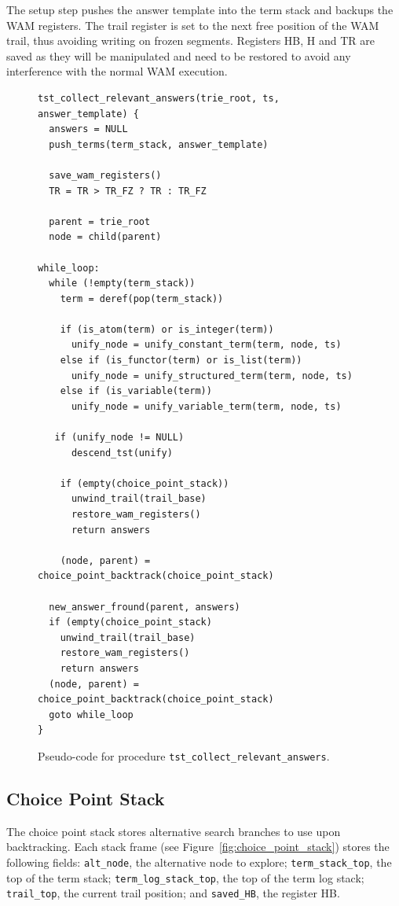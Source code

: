 The setup step pushes the answer template into the term stack and backups the WAM registers.
The trail register is set to the next free position
of the WAM trail, thus avoiding writing on frozen segments. Registers HB, H and TR are
saved as they will be manipulated and need to be restored to avoid any interference with
the normal WAM execution.

\begin{figure}[ht]
\begin{Verbatim}
tst_collect_relevant_answers(trie_root, ts, answer_template) {
  answers = NULL
  push_terms(term_stack, answer_template)
  
  save_wam_registers()
  TR = TR > TR_FZ ? TR : TR_FZ
 
  parent = trie_root
  node = child(parent)
  
while_loop:
  while (!empty(term_stack))
    term = deref(pop(term_stack))
    
    if (is_atom(term) or is_integer(term))
      unify_node = unify_constant_term(term, node, ts)
    else if (is_functor(term) or is_list(term))
      unify_node = unify_structured_term(term, node, ts)
    else if (is_variable(term))
      unify_node = unify_variable_term(term, node, ts)
      
   if (unify_node != NULL)
      descend_tst(unify)
      
    if (empty(choice_point_stack))
      unwind_trail(trail_base)
      restore_wam_registers()
      return answers
    
    (node, parent) = choice_point_backtrack(choice_point_stack)
  
  new_answer_fround(parent, answers)
  if (empty(choice_point_stack)
    unwind_trail(trail_base)
    restore_wam_registers()
    return answers  
  (node, parent) = choice_point_backtrack(choice_point_stack)
  goto while_loop
}
\end{Verbatim}
\caption{Pseudo-code for procedure \texttt{tst\_collect\_relevant\_answers}.}
\label{fig:tst_collect_relevant_answers}
\end{figure}

\subsection{Choice Point Stack}

The choice point stack stores alternative search branches to use upon backtracking.
Each stack frame (see Figure~\ref{fig:choice_point_stack}) stores the following fields:
\texttt{alt\_node}, the alternative node to explore;
\texttt{term\_stack\_top}, the top of the term stack;
\texttt{term\_log\_stack\_top}, the top of the term log stack;
\texttt{trail\_top}, the current trail position;
and \texttt{saved\_HB}, the register HB.

